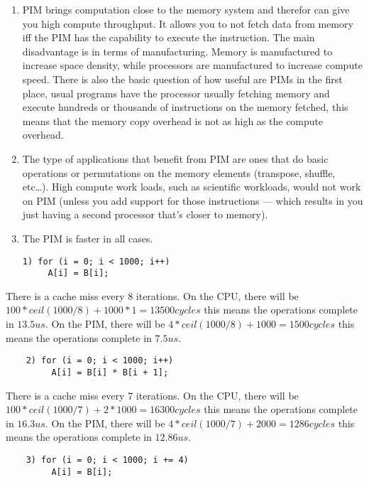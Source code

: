 \begin{enumerate}
\def\labelenumi{\alph{enumi}.}
\item
  PIM brings computation close to the memory system and therefor can
  give you high compute throughput. It allows you to not fetch data from
  memory iff the PIM has the capability to execute the instruction. The
  main disadvantage is in terms of manufacturing. Memory is manufactured
  to increase space density, while processors are manufactured to
  increase compute speed. There is also the basic question of how useful
  are PIMs in the first place, usual programs have the processor usually
  fetching memory and execute hundreds or thousands of instructions on
  the memory fetched, this means that the memory copy overhead is not as
  high as the compute overhead.
\item
  The type of applications that benefit from PIM are ones that do basic
  operations or permutations on the memory elements (transpose, shuffle,
  etc\ldots{}). High compute work loads, such as scientific workloads,
  would not work on PIM (unless you add support for those instructions
  --- which results in you just having a second processor that's closer
  to memory).
\item
  The PIM is faster in all cases.

\begin{verbatim}
1) for (i = 0; i < 1000; i++) 
     A[i] = B[i]; 
\end{verbatim}
\end{enumerate}

There is a cache miss every 8 iterations. On the CPU, there will be
$100*ceil(1000/8) + 1000*1 = 13500cycles$ this means the operations
complete in $13.5us$. On the PIM, there will be
$4*ceil(1000/8) + 1000 = 1500cycles$ this means the operations complete
in $7.5us$.

\begin{verbatim}
    2) for (i = 0; i < 1000; i++) 
         A[i] = B[i] * B[i + 1]; 
\end{verbatim}

There is a cache miss every 7 iterations. On the CPU, there will be
$100*ceil(1000/7) + 2*1000 = 16300cycles$ this means the operations
complete in $16.3us$. On the PIM, there will be
$4*ceil(1000/7) + 2000 = 1286cycles$ this means the operations complete
in $12.86us$.

\begin{verbatim}
    3) for (i = 0; i < 1000; i += 4) 
         A[i] = B[i]; 
\end{verbatim}

